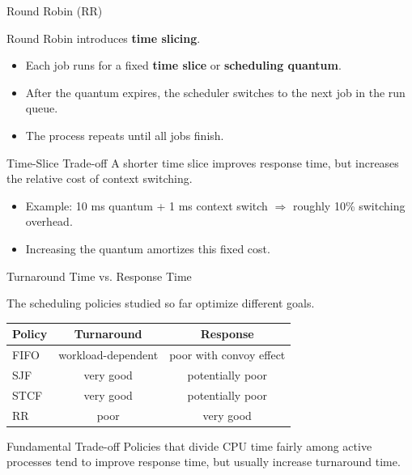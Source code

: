 \begin{frame}{Round Robin (RR)}

Round Robin introduces \textbf{time slicing}.

\begin{itemize}
    \item Each job runs for a fixed \textbf{time slice} or
          \textbf{scheduling quantum}.
    \item After the quantum expires, the scheduler switches to the
          next job in the run queue.
    \item The process repeats until all jobs finish.
\end{itemize}

\begin{block}{Time-Slice Trade-off}
A shorter time slice improves response time, but increases the
relative cost of context switching.
\end{block}

\begin{itemize}
    \item Example: 10 ms quantum + 1 ms context switch
          \(\Rightarrow\) roughly 10\% switching overhead.
    \item Increasing the quantum amortizes this fixed cost.
\end{itemize}

\end{frame}

\begin{frame}{Turnaround Time vs. Response Time}

The scheduling policies studied so far optimize different goals.

\begin{table}
\centering
\small

\begin{tabular}{lcc}
\hline
\textbf{Policy} &
\textbf{Turnaround} &
\textbf{Response} \\
\hline
FIFO      & workload-dependent & poor with convoy effect \\
SJF       & very good          & potentially poor \\
STCF      & very good          & potentially poor \\
RR        & poor               & very good \\
\hline
\end{tabular}

\end{table}

\begin{block}{Fundamental Trade-off}
Policies that divide CPU time fairly among active processes tend to
improve response time, but usually increase turnaround time.
\end{block}

\end{frame}

